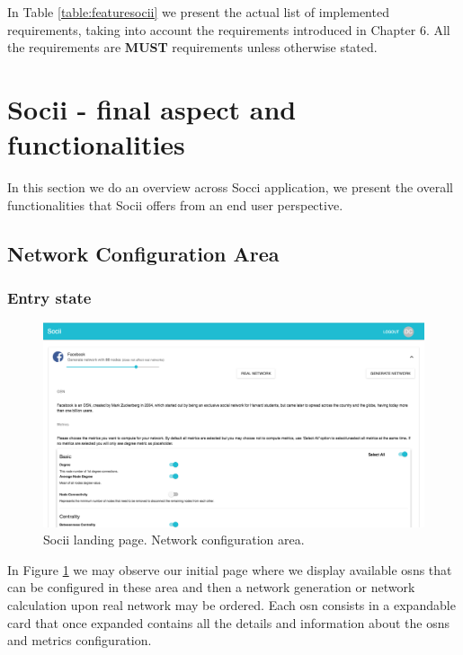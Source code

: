 In Table \ref{table:featuresocii} we present the actual list of implemented requirements, taking into account the requirements introduced in Chapter 6. All the requirements are \textbf{MUST} requirements unless otherwise stated.

\section{Socii - final aspect and functionalities}
In this section we do an overview across Socci application, we present the overall functionalities that Socii offers
from an end user perspective.

\subsection{Network Configuration Area}

\subsubsection*{Entry state}

\begin{figure}[h!]
\begin{center}
  \hspace*{-0.8in}
  \includegraphics[width=1.2\textwidth]{img/socii/socii_1_v2.png}
\end{center}
\caption{\label{img:socii_1} Socii landing page. Network configuration area.}
\end{figure}

In Figure \ref{img:socii_1} we may observe our initial page where we display available \glspl{osn} that can be configured in these area and then a network generation or network calculation upon real network may be ordered. Each \gls{osn} consists in a expandable card that once expanded contains all the details and information about the \glspl{osn} and metrics configuration.

